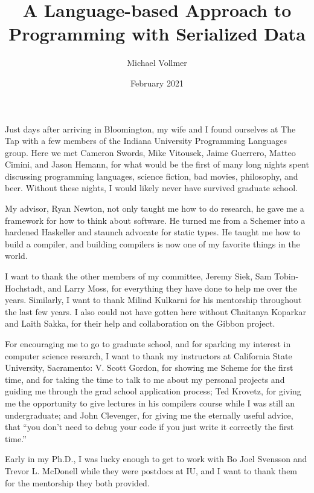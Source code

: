 \documentclass[showabstract,showacknowledgments,showpreface,showdedication,school]{iuphd}
\title{A Language-based Approach to Programming with Serialized Data}
\author{Michael Vollmer}
\date{February 2021} \department{Informatics, Computing, and Engineering}
\theoremstyle{nonumberplain}
\begin{document}
\maketitle
\acceptancepage




\begin{acknowledgments}

  Just days after arriving in Bloomington, my wife and I found ourselves at The
  Tap with a few members of the Indiana University Programming Languages group.
  Here we met Cameron Swords, Mike Vitousek, Jaime Guerrero, Matteo Cimini, and
  Jason Hemann, for what would be the first of many long nights spent discussing
  programming languages, science fiction, bad movies, philosophy, and beer.
  Without these nights, I would likely never have survived graduate school.

  My advisor, Ryan Newton, not only taught me how to do research, he gave me a
  framework for how to think about software. He turned me from a Schemer into a
  hardened Haskeller and staunch advocate for static types. He taught me how to
  build a compiler, and building compilers is now one of my favorite things in the
  world.

  I want to thank the other members of my committee, Jeremy Siek, Sam
  Tobin-Hochstadt, and Larry Moss, for everything they have done to help me over
  the years. Similarly, I want to thank Milind Kulkarni for his mentorship
  throughout the last few years.
  I also could not have gotten here without Chaitanya
  Koparkar and Laith Sakka, for their help and collaboration on the Gibbon project.

  For encouraging me to go to graduate school, and for sparking my interest in
  computer science research, I want to thank my instructors at California State
  University, Sacramento: V. Scott Gordon, for showing me Scheme for the first
  time, and for taking the time to talk to me about my personal projects and guiding
  me through the grad school application process; Ted Krovetz, for giving me the
  opportunity to give lectures in his compilers course while I was still an
  undergraduate; and John Clevenger, for giving me the eternally useful advice,
  that ``you don't need to debug your code if you just write it correctly the first time.''

  Early in my Ph.D., I was lucky enough to get to work with Bo Joel Svensson and
  Trevor L. McDonell while they were postdocs at IU, and I want to thank them for
  the mentorship they both provided.


\end{acknowledgments}
\end{document}
